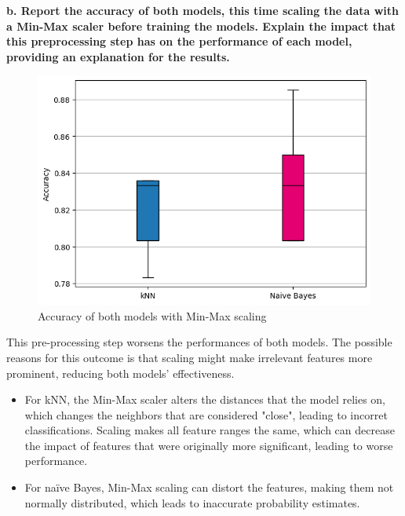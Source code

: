 \documentclass[12pt]{article}
\begin{document}
    \vspace{20pt}
    \textbf{b. Report the accuracy of both models, this time scaling the data with a
    Min-Max scaler before training the models. Explain the impact that this
    preprocessing step has on the performance of each model, providing an
    explanation for the results.}

    \vspace{20pt}
    

    \begin{figure}[H]
        \centering
        \includegraphics[width=12cm]{./Part II/1_b.png}
        \caption{Accuracy of both models with Min-Max scaling}
    \end{figure}

    \vspace{20pt}
    This pre-processing step worsens the performances of both models. The possible reasons for this outcome is that scaling might make irrelevant features more prominent, reducing both models' effectiveness.

    \begin{itemize}
        \item For kNN, the Min-Max scaler alters the distances that the model relies on, which changes the neighbors that are considered "close", leading to incorret classifications.
        Scaling makes all feature ranges the same, which can decrease the impact of features that were originally more significant, leading to worse performance.
        \item For naïve Bayes, Min-Max scaling can distort the features, making them not normally distributed, which leads to inaccurate probability estimates.
    \end{itemize}
\end{document}
